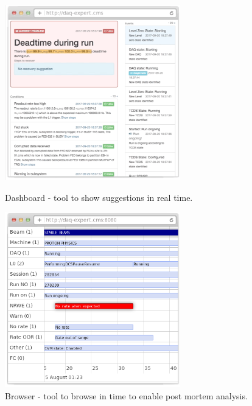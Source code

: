 \documentclass[a4paper]{jpconf}
\begin{document}
\begin{figure}[h]
\begin{minipage}{18pc}
\includegraphics[width=18pc]{tool-dashboard2.png}
\caption{\label{dashboard-tool}Dashboard - tool to show suggestions in real time.}
\end{minipage} \hspace{2pc}%
\begin{minipage}{18pc}
\includegraphics[width=18pc]{tool-browser2.png}
\caption{\label{browser-tool}Browser - tool to browse in time to enable post mortem analysis.}
\end{minipage}
\end{figure}
\end{document}
